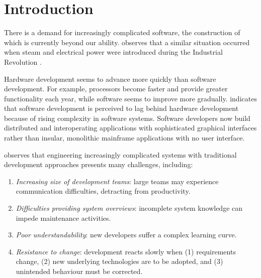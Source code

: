 

\chapter{Introduction}
\label{Introduction}
There is a demand for increasingly complicated software, the construction of which is currently beyond our ability. \cite{selic03pragmatics} observes that a similar situation occurred when steam and electrical power were introduced during the Industrial Revolution \cite{pool97society}. 

Hardware development seems to advance more quickly than software development. For example, processors become faster and provide greater functionality each year, while software seems to improve more gradually. \cite{kleppe03mda} indicates that software development is perceived to lag behind hardware development because of rising complexity in software systems. Software developers now build distributed and interoperating applications with sophisticated graphical interfaces rather than insular, monolithic mainframe applications with no user interface.

\cite{brooks86nosilverbullet} observes that engineering increasingly complicated systems with traditional development approaches presents many challenges, including:

\begin{enumerate}
 \item \textit{Increasing size of development teams}: large teams may experience communication difficulties, detracting from productivity.
 \item \textit{Difficulties providing system overviews}: incomplete system knowledge can impede maintenance activities.
 \item \textit{Poor understandability}: new developers suffer a complex learning curve.
 \item \textit{Resistance to change}: development reacts slowly when (1) requirements change, (2) new underlying technologies are to be adopted, and (3) unintended behaviour must be corrected.
\end{enumerate}

